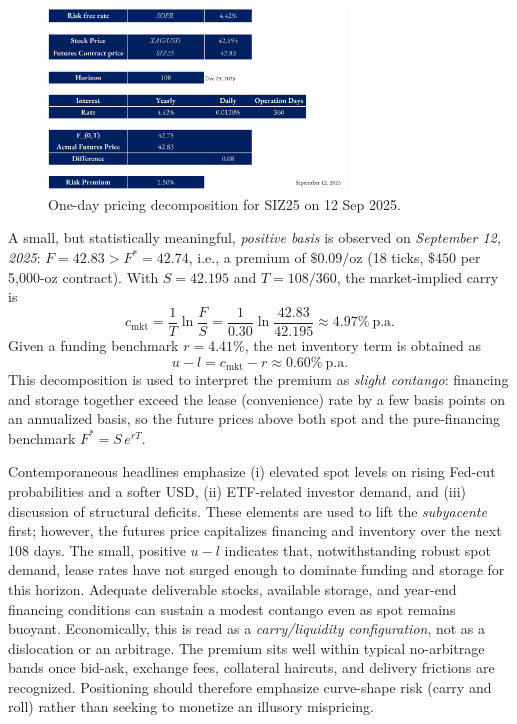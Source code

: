 \documentclass[11pt,a4paper]{article} %
\begin{document}
\begin{figure}[h]
\centering
\includegraphics[width=0.7\textwidth]{figures/silver_pricing_one_day.png}
\caption{One-day pricing decomposition for SIZ25 on 12 Sep 2025.}
\label{fig:silver_one_day}
\end{figure}


A small, but statistically meaningful, \emph{positive basis} is observed on \emph{September 12, 2025}: \(F=42.83>F^{*}=42.74\), i.e., a premium of \(\$0.09/\mathrm{oz}\) (18 ticks, \(\$450\) per 5{,}000-oz contract). With \(S=42.195\) and \(T=108/360\), the market-implied carry is
\[
c_{\mathrm{mkt}}=\frac{1}{T}\ln\!\frac{F}{S}=\frac{1}{0.30}\ln\!\frac{42.83}{42.195}\approx 4.97\% \ \text{p.a.}
\]
Given a funding benchmark \(r=4.41\%\), the net inventory term is obtained as
\[
u-l=c_{\mathrm{mkt}}-r\approx 0.60\%\ \text{p.a.}
\]
This decomposition is used to interpret the premium as \emph{slight contango}: financing and storage together exceed the lease (convenience) rate by a few basis points on an annualized basis, so the future prices above both spot and the pure-financing benchmark \(F^{*}=S\,e^{rT}\).



Contemporaneous headlines emphasize (i) elevated spot levels on rising Fed-cut probabilities and a softer USD, (ii) ETF-related investor demand, and (iii) discussion of structural deficits. These elements are used to lift the \emph{subyacente} first; however, the futures price capitalizes financing and inventory over the next 108 days. The small, positive \(u-l\) indicates that, notwithstanding robust spot demand, lease rates have not surged enough to dominate funding and storage for this horizon. Adequate deliverable stocks, available storage, and year-end financing conditions can sustain a modest contango even as spot remains buoyant. Economically, this is read as a \emph{carry/liquidity configuration}, not as a dislocation or an arbitrage.
 The premium sits well within typical no-arbitrage bands once bid-ask, exchange fees, collateral haircuts, and delivery frictions are recognized. Positioning should therefore emphasize curve-shape risk (carry and roll) rather than seeking to monetize an illusory mispricing.
\end{document}
